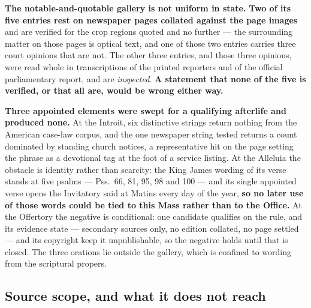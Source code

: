 \textbf{The notable-and-quotable gallery is not uniform in state.}
\textbf{Two of its five entries rest on newspaper pages collated against the
page images} and are verified for the crop regions quoted and no further --- the
surrounding matter on those pages is optical text, and one of those two entries
carries three court opinions that are not. The other three entries, and those
three opinions, were read whole in transcriptions of the printed reporters and
of the official parliamentary report, and are \emph{inspected}. \textbf{A
statement that none of the five is verified, or that all are, would be wrong
either way.}

\textbf{Three appointed elements were swept for a qualifying afterlife and
produced none.} At the Introit, six distinctive strings return nothing from
the American case-law corpus, and the one newspaper string tested returns a
count dominated by standing church notices, a representative hit on the page
setting the phrase as a devotional tag at the foot of a service listing. At
the Alleluia the obstacle is identity rather than scarcity: the King James
wording of its verse stands at five psalms --- Pss.\ 66, 81, 95, 98 and 100 ---
and its single appointed verse opens the Invitatory said at Matins every day of
the year, \textbf{so no later use of those words could be tied to this Mass
rather than to the Office.} At the Offertory the negative is conditional: one candidate qualifies on
the rule, and its evidence state --- secondary sources only, no edition
collated, no page settled --- and its copyright keep it unpublishable, so the
negative holds until that is closed. The three orations lie outside the
gallery, which is confined to wording from the scriptural propers.

\subsection*{Source scope, and what it does not reach}

